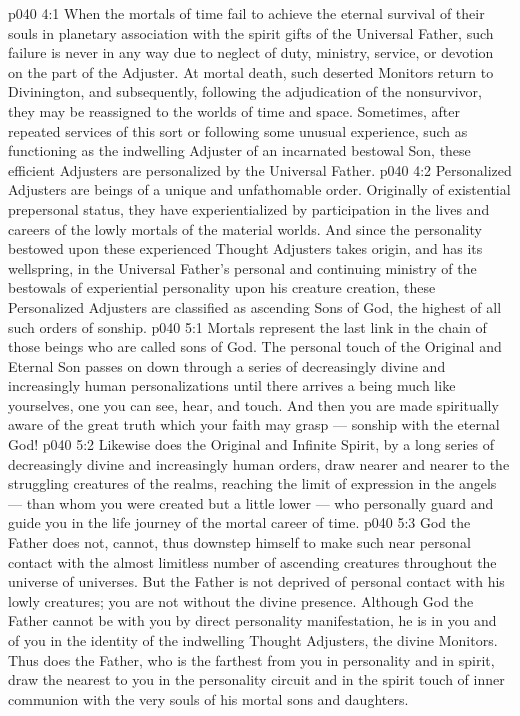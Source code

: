 \vs p040 4:1 When the mortals of time fail to achieve the eternal survival of their souls in planetary association with the spirit gifts of the Universal Father, such failure is never in any way due to neglect of duty, ministry, service, or devotion on the part of the Adjuster. At mortal death, such deserted Monitors return to Divinington, and subsequently, following the adjudication of the nonsurvivor, they may be reassigned to the worlds of time and space. Sometimes, after repeated services of this sort or following some unusual experience, such as functioning as the indwelling Adjuster of an incarnated bestowal Son, these efficient Adjusters are personalized by the Universal Father.
\vs p040 4:2 Personalized Adjusters are beings of a unique and unfathomable order. Originally of existential prepersonal status, they have experientialized by participation in the lives and careers of the lowly mortals of the material worlds. And since the personality bestowed upon these experienced Thought Adjusters takes origin, and has its wellspring, in the Universal Father’s personal and continuing ministry of the bestowals of experiential personality upon his creature creation, these Personalized Adjusters are classified as ascending Sons of God, the highest of all such orders of sonship.
\vs p040 5:1 Mortals represent the last link in the chain of those beings who are called sons of God. The personal touch of the Original and Eternal Son passes on down through a series of decreasingly divine and increasingly human personalizations until there arrives a being much like yourselves, one you can see, hear, and touch. And then you are made spiritually aware of the great truth which your faith may grasp --- sonship with the eternal God!
\vs p040 5:2 Likewise does the Original and Infinite Spirit, by a long series of decreasingly divine and increasingly human orders, draw nearer and nearer to the struggling creatures of the realms, reaching the limit of expression in the angels --- than whom you were created but a little lower --- who personally guard and guide you in the life journey of the mortal career of time.
\vs p040 5:3 God the Father does not, cannot, thus downstep himself to make such near personal contact with the almost limitless number of ascending creatures throughout the universe of universes. But the Father is not deprived of personal contact with his lowly creatures; you are not without the divine presence. Although God the Father cannot be with you by direct personality manifestation, he is in you and of you in the identity of the indwelling Thought Adjusters, the divine Monitors. Thus does the Father, who is the farthest from you in personality and in spirit, draw the nearest to you in the personality circuit and in the spirit touch of inner communion with the very souls of his mortal sons and daughters.
